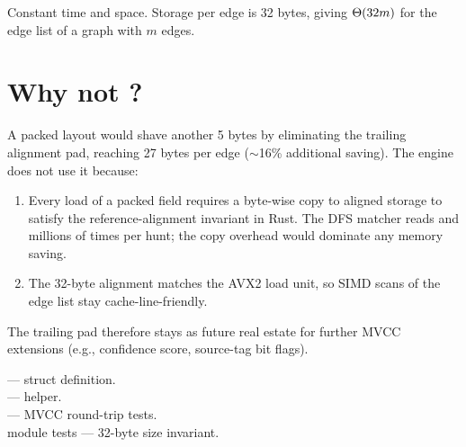 \begin{complexity}
Constant time and space. Storage per edge is 32 bytes, giving
$\Theta(32 m)$ for the edge list of a graph with $m$ edges.
\end{complexity}

\section{Why not ?}

A packed layout would shave another 5 bytes by eliminating the
trailing alignment pad, reaching 27 bytes per edge ($\sim$16\%
additional saving). The engine does not use it because:

\begin{enumerate}
    \item Every load of a packed field requires a byte-wise copy to
        aligned storage to satisfy the reference-alignment
        invariant in Rust. The DFS matcher reads 
        and  millions of times per hunt; the copy
        overhead would dominate any memory saving.
    \item The 32-byte alignment matches the AVX2 load unit, so SIMD
        scans of the edge list stay cache-line-friendly.
\end{enumerate}

The trailing pad therefore stays as future real estate for further
MVCC extensions (e.g., confidence score, source-tag bit flags).

\begin{inthecode}
 --- struct
definition.\\
 ---
 helper.\\
 ---
MVCC round-trip tests.\\
 module tests ---
32-byte size invariant.
\end{inthecode}
